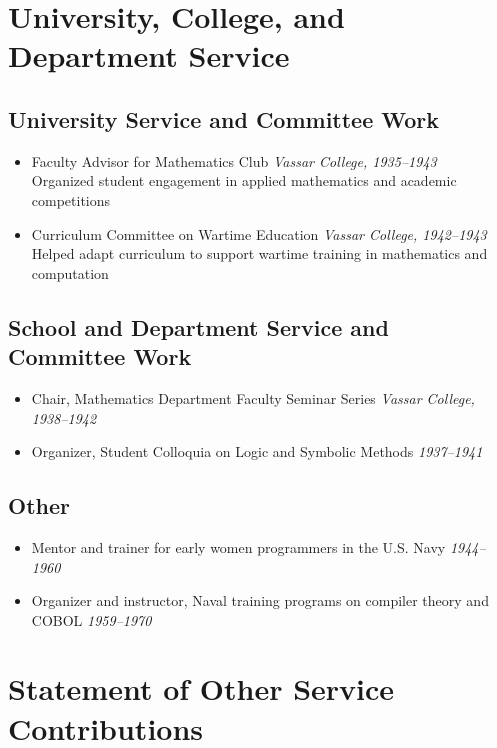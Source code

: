 \documentclass[11pt]{report}
\newcommand{\dates}[1]{\hfill \textit{#1}}
\begin{document}
\begin{internalonly}
\chapter{University, College, and Department Service}

\section{University Service and Committee Work}

\begin{itemize}
\item Faculty Advisor for Mathematics Club \dates{Vassar College, 1935--1943} \\
  Organized student engagement in applied mathematics and academic competitions
\item Curriculum Committee on Wartime Education \dates{Vassar College, 1942--1943} \\
  Helped adapt curriculum to support wartime training in mathematics and computation
\end{itemize}

\section{School and Department Service and Committee Work}

\begin{itemize}
\item Chair, Mathematics Department Faculty Seminar Series \dates{Vassar College, 1938--1942}
\item Organizer, Student Colloquia on Logic and Symbolic Methods \dates{1937--1941}
\end{itemize}

\section{Other}

\begin{itemize}
\item Mentor and trainer for early women programmers in the U.S. Navy \dates{1944--1960}
\item Organizer and instructor, Naval training programs on compiler theory and COBOL \dates{1959--1970}
\end{itemize}


\chapter{Statement of Other Service Contributions}


\end{internalonly}
\end{document}
